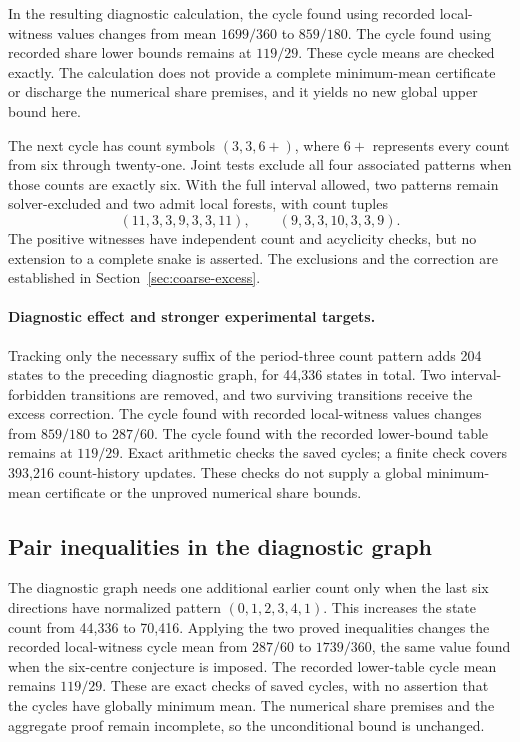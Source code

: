 \documentclass[11pt,a4paper]{article}
\theoremstyle{definition}
\theoremstyle{remark}
\begin{document}
In the resulting diagnostic calculation, the cycle found using recorded local-witness values changes from mean $1699/360$ to $859/180$. The cycle found using recorded share lower bounds remains at $119/29$. These cycle means are checked exactly. The calculation does not provide a complete minimum-mean certificate or discharge the numerical share premises, and it yields no new global upper bound here.

The next cycle has count symbols $(3,3,6+)$, where $6+$ represents every count from six through twenty-one. Joint tests exclude all four associated patterns when those counts are exactly six. With the full interval allowed, two patterns remain solver-excluded and two admit local forests, with count tuples
\[
(11,3,3,9,3,3,11),\qquad (9,3,3,10,3,3,9).
\]
The positive witnesses have independent count and acyclicity checks, but no extension to a complete snake is asserted. The exclusions and the correction are established in Section~\ref{sec:coarse-excess}.

\paragraph{Diagnostic effect and stronger experimental targets.}
Tracking only the necessary suffix of the period-three count pattern adds 204 states to the preceding diagnostic graph, for 44,336 states in total. Two interval-forbidden transitions are removed, and two surviving transitions receive the excess correction. The cycle found with recorded local-witness values changes from $859/180$ to $287/60$. The cycle found with the recorded lower-bound table remains at $119/29$. Exact arithmetic checks the saved cycles; a finite check covers 393,216 count-history updates. These checks do not supply a global minimum-mean certificate or the unproved numerical share bounds.

\subsection{Pair inequalities in the diagnostic graph}
The diagnostic graph needs one additional earlier count only when the last six directions have normalized pattern $(0,1,2,3,4,1)$. This increases the state count from 44,336 to 70,416. Applying the two proved inequalities changes the recorded local-witness cycle mean from $287/60$ to $1739/360$, the same value found when the six-centre conjecture is imposed. The recorded lower-table cycle mean remains $119/29$. These are exact checks of saved cycles, with no assertion that the cycles have globally minimum mean. The numerical share premises and the aggregate proof remain incomplete, so the unconditional bound is unchanged.
\end{document}
